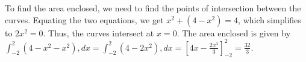 To find the area enclosed, we need to find the points of intersection between the curves. Equating the two equations, we get $x^2 + (4 - x^2) = 4$, which simplifies to $2x^2 = 0$. Thus, the curves intersect at $x = 0$. The area enclosed is given by $\int_{-2}^{2} (4 - x^2 - x^2) , dx = \int_{-2}^{2} (4 - 2x^2) , dx = \left[4x - \frac{2x^3}{3}\right]_{-2}^{2} = \frac{32}{3}$.
